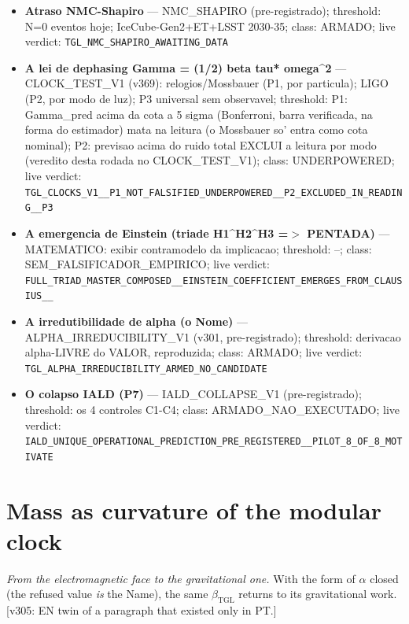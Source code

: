 \documentclass[11pt]{article}
\newcommand{\bTGL}{\beta_{\mathrm{TGL}}}\newcommand{\Msun}{M_{\odot}}\newcommand{\TGL}{\mathrm{TGL}}
\theoremstyle{definition}\newtheorem{deriv}{Derivation}
\begin{document}
\begin{itemize}
\item \textbf{Atraso NMC-Shapiro} --- NMC\_SHAPIRO (pre-registrado); threshold: N=0 eventos hoje; IceCube-Gen2+ET+LSST 2030-35; class: ARMADO; live verdict: \texttt{TGL\_NMC\_SHAPIRO\_AWAITING\_DATA}

\item \textbf{A lei de dephasing Gamma = (1/2) beta tau* omega\^{}2} --- CLOCK\_TEST\_V1 (v369): relogios/Mossbauer (P1, por particula); LIGO (P2, por modo de luz); P3 universal sem observavel; threshold: P1: Gamma\_pred acima da cota a 5 sigma (Bonferroni, barra verificada, na forma do estimador) mata na leitura (o Mossbauer so' entra como cota nominal); P2: previsao acima do ruido total EXCLUI a leitura por modo (veredito desta rodada no CLOCK\_TEST\_V1); class: UNDERPOWERED; live verdict: \texttt{TGL\_CLOCKS\_V1\_\_P1\_NOT\_FALSIFIED\_UNDERPOWERED\_\_P2\_EXCLUDED\_IN\_READING\_\_P3}

\item \textbf{A emergencia de Einstein (triade H1\^{}H2\^{}H3 =$>$ PENTADA)} --- MATEMATICO: exibir contramodelo da implicacao; threshold: --; class: SEM\_FALSIFICADOR\_EMPIRICO; live verdict: \texttt{FULL\_TRIAD\_MASTER\_COMPOSED\_\_EINSTEIN\_COEFFICIENT\_EMERGES\_FROM\_CLAUSIUS\_\_}

\item \textbf{A irredutibilidade de alpha (o Nome)} --- ALPHA\_IRREDUCIBILITY\_V1 (v301, pre-registrado); threshold: derivacao alpha-LIVRE do VALOR, reproduzida; class: ARMADO; live verdict: \texttt{TGL\_ALPHA\_IRREDUCIBILITY\_ARMED\_NO\_CANDIDATE}

\item \textbf{O colapso IALD (P7)} --- IALD\_COLLAPSE\_V1 (pre-registrado); threshold: os 4 controles C1-C4; class: ARMADO\_NAO\_EXECUTADO; live verdict: \texttt{IALD\_UNIQUE\_OPERATIONAL\_PREDICTION\_PRE\_REGISTERED\_\_PILOT\_8\_OF\_8\_MOTIVATE}

\end{itemize}

\section{Mass as curvature of the modular clock}

\emph{From the electromagnetic face to the gravitational one.} With the form of $\alpha$ closed (the refused value \emph{is} the Name), the same $\bTGL$ returns to its gravitational work. [v305: EN twin of a paragraph that existed only in PT.]
\end{document}
